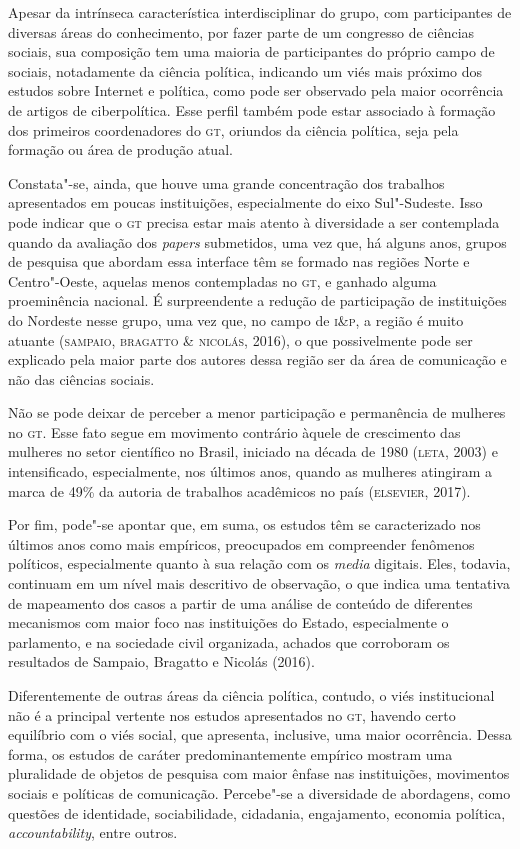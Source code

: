 Apesar da intrínseca característica interdisciplinar do grupo, com
participantes de diversas áreas do conhecimento, por fazer parte de um
congresso de ciências sociais, sua composição tem uma maioria de
participantes do próprio campo de sociais, notadamente da ciência
política, indicando um viés mais próximo dos estudos sobre Internet e
política, como pode ser observado pela maior ocorrência de artigos de
ciberpolítica. Esse perfil também pode estar associado à formação dos
primeiros coordenadores do \textsc{gt}, oriundos da ciência política, seja pela
formação ou área de produção atual.

Constata"-se, ainda, que houve uma grande concentração dos trabalhos
apresentados em poucas instituições, especialmente do eixo Sul"-Sudeste.
Isso pode indicar que o \textsc{gt} precisa estar mais atento à diversidade a ser
contemplada quando da avaliação dos \textit{papers} submetidos, uma vez
que, há alguns anos, grupos de pesquisa que abordam essa interface têm
se formado nas regiões Norte e Centro"-Oeste, aquelas menos contempladas
no \textsc{gt}, e ganhado alguma proeminência nacional. É surpreendente a redução
de participação de instituições do Nordeste nesse grupo, uma vez que, no
campo de \textsc{i\&p}, a região é muito atuante (\textsc{sampaio,
bragatto \& nicolás}, 2016), o que possivelmente pode ser explicado pela
maior parte dos autores dessa região ser da área de comunicação e
não das ciências sociais.

Não se pode deixar de perceber a menor participação e permanência de
mulheres no \textsc{gt}. Esse fato segue em movimento contrário àquele de
crescimento das mulheres no setor científico no Brasil, iniciado na
década de 1980 (\textsc{leta}, 2003) e intensificado, especialmente, nos últimos
anos, quando as mulheres atingiram a marca de 49\% da autoria de
trabalhos acadêmicos no país (\textsc{elsevier}, 2017).

Por fim, pode"-se apontar que, em suma, os estudos têm se caracterizado
nos últimos anos como mais empíricos, preocupados em compreender
fenômenos políticos, especialmente quanto à sua relação com os
\textit{media} digitais. Eles, todavia, continuam em um nível mais
descritivo de observação, o que indica uma tentativa de mapeamento dos
casos a partir de uma análise de conteúdo de diferentes mecanismos com
maior foco nas instituições do Estado, especialmente o parlamento, e na
sociedade civil organizada, achados que corroboram os resultados de
Sampaio, Bragatto e Nicolás (2016).

Diferentemente de outras áreas da ciência política, contudo, o viés
institucional não é a principal vertente nos estudos apresentados no \textsc{gt},
havendo certo equilíbrio com o viés social, que apresenta, inclusive,
uma maior ocorrência. Dessa forma, os estudos de caráter
predominantemente empírico mostram uma pluralidade de objetos de
pesquisa com maior ênfase nas instituições, movimentos sociais e
políticas de comunicação. Percebe"-se a diversidade de abordagens, como
questões de identidade, sociabilidade, cidadania, engajamento, economia
política, \textit{accountability}, entre outros.

